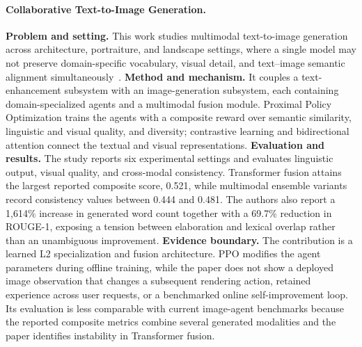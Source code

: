 \paragraph{Collaborative Text-to-Image Generation.}
\textbf{Problem and setting.} This work studies multimodal text-to-image generation across architecture, portraiture, and landscape settings, where a single model may not preserve domain-specific vocabulary, visual detail, and text--image semantic alignment simultaneously~\cite{avg251010633}. \textbf{Method and mechanism.} It couples a text-enhancement subsystem with an image-generation subsystem, each containing domain-specialized agents and a multimodal fusion module. Proximal Policy Optimization trains the agents with a composite reward over semantic similarity, linguistic and visual quality, and diversity; contrastive learning and bidirectional attention connect the textual and visual representations. \textbf{Evaluation and results.} The study reports six experimental settings and evaluates linguistic output, visual quality, and cross-modal consistency. Transformer fusion attains the largest reported composite score, 0.521, while multimodal ensemble variants record consistency values between 0.444 and 0.481. The authors also report a 1,614\% increase in generated word count together with a 69.7\% reduction in ROUGE-1, exposing a tension between elaboration and lexical overlap rather than an unambiguous improvement. \textbf{Evidence boundary.} The contribution is a learned L2 specialization and fusion architecture. PPO modifies the agent parameters during offline training, while the paper does not show a deployed image observation that changes a subsequent rendering action, retained experience across user requests, or a benchmarked online self-improvement loop. Its evaluation is less comparable with current image-agent benchmarks because the reported composite metrics combine several generated modalities and the paper identifies instability in Transformer fusion.

